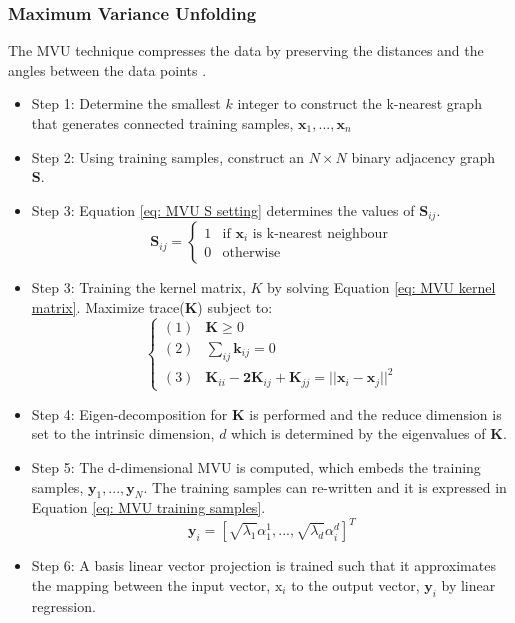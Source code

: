 \documentclass[11pt,twocolumn]{witseiepaper}
\begin{document}
	\subsubsection{Maximum Variance Unfolding}
	The MVU technique compresses the data by preserving the distances and the angles between the data points \cite{Shao2009}. 
	\begin{itemize}
		\item Step 1: Determine the smallest $k$ integer to construct the k-nearest graph that generates connected training samples, $\textbf{x}_1, . . . ,\textbf{x}_n$ \\
		\item Step 2: Using training samples, construct an $N \times N$ binary adjacency graph \textbf{S}. \\
		\item Step 3: Equation \ref{eq: MVU S setting} determines the values of $\textbf{S}_{ij}$.
		\begin{equation}
			\label{eq: MVU S setting}
			\textbf{S}_{ij} = 
			\begin{cases}
				1 & \text{if } \textbf{x}_i \text{ is k-nearest neighbour} \\
				0 & \text{otherwise}
			\end{cases}
		\end{equation}
		\item Step 3: Training the kernel matrix, $K$ by solving Equation \ref{eq: MVU kernel matrix}.
		\newline
		Maximize trace(\textbf{K}) subject to:
		\begin{equation}
			\label{eq: MVU kernel matrix}
			\begin{cases}
				(1) &\textbf{K} \geq 0 \\
				(2) &\sum_{ij}\textbf{k}_{ij} = 0 \\
				(3) &\textbf{K}_{ii} - \textbf{2K}_{ij} + \textbf{K}_{jj} = ||\textbf{x}_i - \textbf{x}_j||^2
			\end{cases}
		\end{equation}
		\item Step 4: Eigen-decomposition for $\textbf{K}$ is performed and the reduce dimension is set to the intrinsic dimension, $d$ which is determined by the eigenvalues of $\textbf{K}$.\\
		\item Step 5: The d-dimensional MVU is computed, which embeds the training samples, $\textbf{y}_1, . . . , \textbf{y}_N$. The training samples can re-written and it is expressed in Equation \ref{eq: MVU training samples}.
		\begin{equation}
			\label{eq: MVU training samples}
			\textbf{y}_i = [\sqrt{\lambda_1}\alpha_1^1, . . . ,\sqrt{\lambda_d}\alpha_i^d]^T
		\end{equation}
		\item Step 6: A basis linear vector projection is trained such that it approximates the mapping between the input vector, $\text{x}_i$ to the output vector, $\textbf{y}_i$ by linear regression.
	\end{itemize}
	
\end{document}
